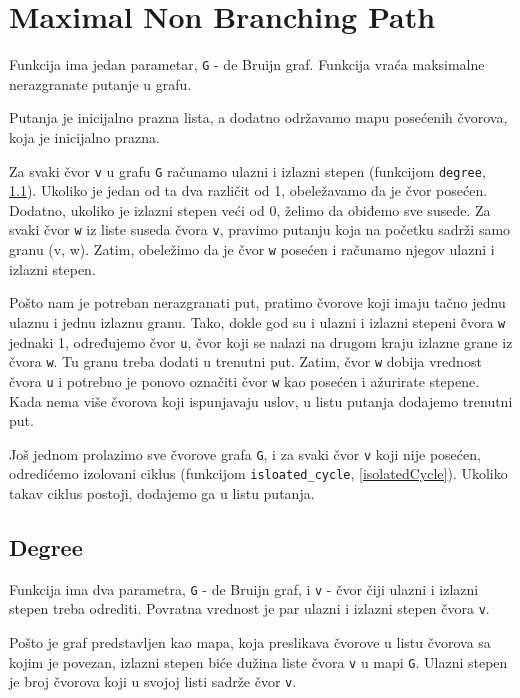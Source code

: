 \section{Maximal Non Branching Path}

Funkcija ima jedan parametar, \texttt{G} - de Bruijn graf. Funkcija vraća maksimalne nerazgranate putanje u grafu.

Putanja je inicijalno prazna lista, a dodatno održavamo mapu posećenih čvorova, koja je inicijalno prazna.

Za svaki čvor \texttt{v} u grafu \texttt{G} računamo ulazni i izlazni stepen (funkcijom \texttt{degree}, \ref{degree}). Ukoliko je jedan od ta dva različit od 1, obeležavamo da je čvor posećen. Dodatno, ukoliko je izlazni stepen veći od 0, želimo da obiđemo sve susede. Za svaki čvor \texttt{w} iz liste suseda čvora \texttt{v}, pravimo putanju koja na početku sadrži samo granu (v, w). Zatim, obeležimo da je čvor \texttt{w} posećen i računamo njegov ulazni i izlazni stepen. 

Pošto nam je potreban nerazgranati put, pratimo čvorove koji imaju tačno jednu ulaznu i jednu izlaznu granu. Tako, dokle god su i ulazni i izlazni stepeni čvora \texttt{w} jednaki 1, određujemo čvor \texttt{u}, čvor koji se nalazi na drugom kraju izlazne grane iz čvora \texttt{w}. Tu granu treba dodati u trenutni put. Zatim, čvor \texttt{w} dobija vrednost čvora \texttt{u} i potrebno je ponovo označiti čvor \texttt{w} kao posećen i ažurirate stepene. Kada nema više čvorova koji ispunjavaju uslov, u listu putanja dodajemo trenutni put.

Još jednom prolazimo sve čvorove grafa \texttt{G}, i za svaki čvor \texttt{v} koji nije posećen, odredićemo izolovani ciklus (funkcijom \texttt{isloated\_cycle}, \ref{isolatedCycle}). Ukoliko takav ciklus postoji, dodajemo ga u listu putanja.






\subsection{Degree}
\label{degree}

Funkcija ima dva parametra, \texttt{G} - de Bruijn graf, i \texttt{v} - čvor čiji ulazni i izlazni stepen treba odrediti. Povratna vrednost je par ulazni i izlazni stepen čvora \texttt{v}.

Pošto je graf predstavljen kao mapa, koja preslikava čvorove u listu čvorova sa kojim je povezan, izlazni stepen biće dužina liste čvora \texttt{v} u mapi \texttt{G}. Ulazni stepen je broj čvorova koji u svojoj listi sadrže čvor \texttt{v}. 

